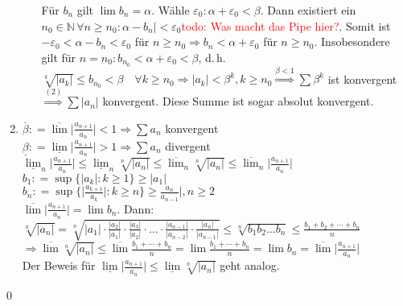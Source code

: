 \documentclass[ngerman,titlepage,twoside, parskip=half*]{scrreprt}
\newcommand*{\N}{\mathbb{N}}
\theoremstyle{plain}
\theoremstyle{definition}
\theoremstyle{remark}
\newcommand*{\todo}[1]{\textcolor{red}{todo: #1}}
\newcommand*{\abs}[2][]{#1\lvert#2#1\rvert}
\newcommand*{\coloneqq}{\mathrel{\mathop:}=}
\begin{document}
\begin{enumerate}[(1)]
\begin{enumerate}[1. F{a}ll]
        Für $b_n$ gilt $\lim b_n=\alpha$. Wähle
      $\varepsilon_0\colon\alpha+\varepsilon_0<\beta$. Dann existiert ein $n_0
      \in \N\,\forall n\geq n_0\colon\alpha
      -b_n|<\varepsilon_0$\todo{Was macht das Pipe hier?}. Somit ist $-\varepsilon_0<\alpha -b_n<\varepsilon_0$ für $n\geq n_0
	\Rightarrow b_n<\alpha +\varepsilon_0$ für $n\geq n_0$. Insobesondere gilt für $n=n_0\colon b_{n_0}<\alpha +\varepsilon_0<
	\beta$, d.\,h. $\sqrt[k]{\abs{a_k}}\leq b_{n_0}<\beta \quad \forall k\geq n_0 \Rightarrow \abs{a_k}<\beta^k, k\geq n_0
	\stackrel{\beta <1}{\Rightarrow} \sum \beta^k$ ist konvergent $\stackrel{(2)}{\Rightarrow} \sum \abs{a_n}$ konvergent.
	Diese Summe ist sogar absolut konvergent.
    \end{enumerate}
  \item $\overline{\beta}\coloneqq\overline{\lim}\abs{\frac{a_{n+1}}{a_n}}<1 \Rightarrow \sum a_n$ konvergent\\
    $\underline{\beta}\coloneqq\underline{\lim}\abs{\frac{a_{n+1}}{a_n}}>1 \Rightarrow \sum a_n$ divergent\\
    $\underline{\lim}_n\abs{\frac{a_{n+1}}{a_n}}\leq \underline{\lim}_n \sqrt[n]{\abs{a_n}}\leq \overline{\lim}_n \sqrt[n]{\abs{a_n}}
    \leq \overline{\lim}_n \abs{\frac{a_{n+1}}{a_n}}$\\
    $b_1\coloneqq\sup \{\abs{a_k}\colon k\geq 1\}\geq \abs{a_1}$\\
    $b_n\coloneqq\sup \{\abs{\frac{a_{k+1}}{a_k}}\colon k\geq n\}\geq \frac{a_n}{a_{n-1}}|, n\geq 2$\\
    $\overline{\lim}\abs{\frac{a_{n+1}}{a_n}}=\lim b_n$. Dann:\\
    $\sqrt[n]{\abs{a_n}}=\sqrt[n]{\abs{a_1}\cdot \frac{\abs{a_2}}{\abs{a_1}}\cdot \frac{\abs{a_3}}{\abs{a_2}}\cdot \ldots \cdot 
    \frac{\abs{a_{n-1}}}{\abs{a_{n-2}}}\cdot \frac{\abs{a_n}}{\abs{a_{n-1}}}} \leq \sqrt[n]{b_1b_2\ldots b_n}\leq 
    \frac{b_1+b_2+\cdots +b_n}{n}$\\
    $\Rightarrow \overline{\lim} \sqrt[n]{\abs{a_n}}\leq \overline{\lim}
    \frac{b_1+\cdots +b_n}{n}=\lim \frac{b_1+\cdots +b_n}{n}=\lim b_n=\overline{\lim} \abs{\frac{a_{n+1}}{a_n}}$\\
    Der Beweis für $\underline{\lim}\abs{\frac{a_{n+1}}{a_n}}\leq \underline{\lim} \sqrt[n]{\abs{a_n}}$ geht analog.
\end{enumerate}
\qed
\end{document}
